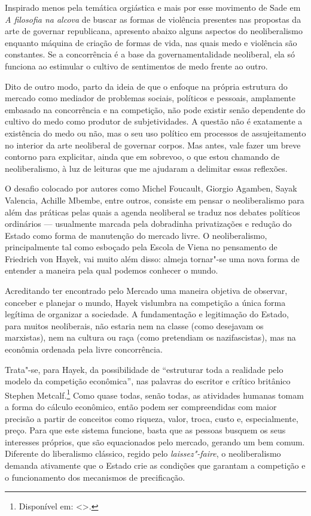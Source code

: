 \asterisc

Inspirado menos pela temática orgiástica e mais por esse movimento de
Sade em \emph{A filosofia na alcova} de buscar as formas de violência
presentes nas propostas da arte de governar republicana, apresento
abaixo alguns aspectos do neoliberalismo enquanto máquina de criação de
formas de vida, nas quais medo e violência são constantes. Se a
concorrência é a base da governamentalidade neoliberal, ela só funciona
ao estimular o cultivo de sentimentos de medo frente ao outro.

Dito de outro modo, parto da ideia de
que o enfoque na própria estrutura do mercado como mediador de problemas
sociais, políticos e pessoais, amplamente embasado na concorrência e na
competição, não pode existir senão dependente do cultivo do medo como
produtor de subjetividades. A questão não é exatamente a existência do
medo ou não, mas o seu uso político em processos de assujeitamento no
interior da arte neoliberal de governar corpos. Mas antes, vale fazer um
breve contorno para explicitar, ainda que em sobrevoo, o que estou
chamando de neoliberalismo, à luz de leituras que me ajudaram a
delimitar essas reflexões.

\asterisc

O desafio colocado por autores como Michel Foucault, Giorgio Agamben,
Sayak Valencia, Achille Mbembe, entre outros, consiste em pensar o
neoliberalismo para além das práticas pelas quais a agenda neoliberal se
traduz nos debates políticos ordinários --- usualmente marcada pela
dobradinha privatizações e redução do Estado como
forma de manutenção do mercado livre. O neoliberalismo, principalmente
tal como esboçado pela Escola de Viena no pensamento de Friedrich von
Hayek, vai muito além disso: almeja tornar"-se uma nova forma de entender
a maneira pela qual podemos conhecer o mundo.

Acreditando ter encontrado pelo Mercado uma maneira objetiva de
observar, conceber e planejar o mundo, Hayek vislumbra na competição a
única forma legítima de organizar a sociedade. A fundamentação e
legitimação do Estado, para muitos neoliberais, não estaria nem na
classe (como desejavam os marxistas), nem na cultura ou raça (como
pretendiam os nazifascistas), mas na econômia ordenada pela livre
concorrência.

Trata"-se, para Hayek, da possibilidade de ``estruturar toda a realidade
pelo modelo da competição econômica'', nas palavras do escritor e
crítico britânico Stephen Metcalf.\footnote{Disponível em: \textless{}{}\textgreater{}.} %
Como quase todas, senão todas, as atividades humanas tomam a forma do
cálculo econômico, então podem ser compreendidas com maior precisão a
partir de conceitos como riqueza, valor, troca, custo e, especialmente,
preço. Para que este sistema funcione, basta que as pessoas busquem os
seus interesses próprios, que são equacionados pelo mercado, gerando um
bem comum. Diferente do liberalismo clássico, regido pelo \emph{laissez"-faire},
o neoliberalismo demanda ativamente que o Estado crie as condições que
garantam a competição e o funcionamento dos mecanismos de precificação.

